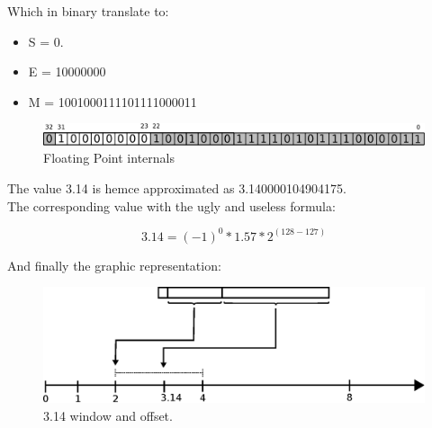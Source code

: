 \documentclass[book.tex]{subfiles}
\begin{document}
Which in binary translate to:

\begin{itemize}
\item S = 0.
\item E = 10000000
\item M = 1001000111101111000011
\end{itemize}

\begin{figure}[H]
\centering
\includegraphics[scale=0.4]{imgs/floating_point_layout_pi.eps}
\caption{Floating Point internals}
\label{fig:fp_internals}
\end{figure}
  \bigskip

The value 3.14 is hemce approximated as 3.140000104904175.\\

The corresponding value with the ugly and useless formula:

\begin{equation}
3.14 = (-1)^0 * 1.57 * 2^{(128-127)}
\end{equation}

\bigskip

And finally the graphic representation:\\

\begin{figure}[H]
\centering
\includegraphics[scale=0.7]{imgs/floating_point_window_pi.eps}

\caption{3.14 window and offset.}
\label{fig:fp_internals}
\end{figure}
  \bigskip
\end{document}
